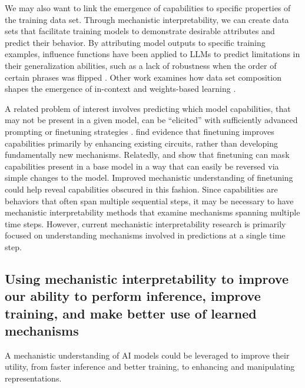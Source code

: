 We may also want to link the emergence of capabilities to specific properties of the training data set. Through mechanistic interpretability, we can create data sets that facilitate training models to demonstrate desirable attributes and predict their behavior. By attributing model outputs to specific training examples, influence functions have been applied to LLMs \citep{Koh_2017_influence_function,grosse2023studyinglargelanguagemodel} to predict limitations in their generalization abilities, such as a lack of robustness when the order of certain phrases was flipped \citep{berglund2024reversalcursellmstrained}. Other work examines how data set composition shapes the emergence of in-context and weights-based learning \citep{reddy2024the}.

A related problem of interest involves predicting which model capabilities, that may not be present in a given model, can be “elicited” with sufficiently advanced prompting or finetuning strategies \citep{greenblatt2024stresstestingcapabilityelicitationpasswordlocked}. \citet{prakash2024finetuningenhancesexistingmechanisms} find evidence that finetuning improves capabilities primarily by enhancing existing circuits, rather than developing fundamentally new mechanisms. Relatedly, \citep{jain2024mechanisticallyanalyzingeffectsfinetuning} and \citet{lee2024mechanisticunderstandingalignmentalgorithms} show that finetuning can mask capabilities present in a base model in a way that can easily be reversed via simple changes to the model. Improved mechanistic understanding of finetuning could help reveal capabilities obscured in this fashion. Since capabilities are behaviors that often span multiple sequential steps, it may be necessary to have mechanistic interpretability methods that examine mechanisms spanning multiple time steps. However, current mechanistic interpretability research is primarily focused on understanding mechanisms involved in predictions at a single time step.


\subsection{Using mechanistic interpretability to improve our ability to perform inference, improve training, and make better use of learned mechanisms}
\label{subsec:capabilities}

A mechanistic understanding of AI models could be leveraged to improve their utility, from faster inference and better training, to enhancing and manipulating representations.

